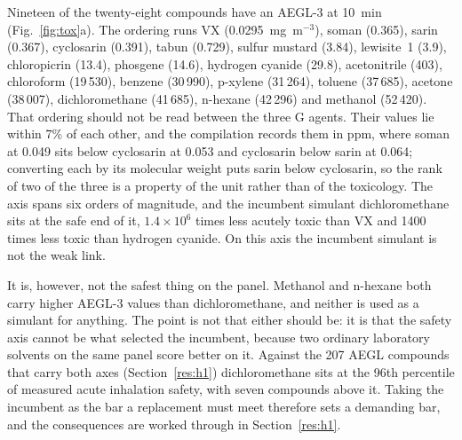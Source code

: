 \documentclass[journal=jacsat,manuscript=suppinfo,margin=1in]{achemso}
\begin{document}
Nineteen of the twenty-eight compounds have an AEGL-3 at 10~min
(Fig.~\ref{fig:tox}a). The ordering runs VX (0.0295~mg~m$^{-3}$), soman (0.365),
sarin (0.367), cyclosarin (0.391), tabun (0.729), sulfur mustard (3.84),
lewisite~1 (3.9), chloropicrin (13.4), phosgene (14.6), hydrogen cyanide (29.8),
acetonitrile (403), chloroform (19\,530), benzene (30\,990), p-xylene (31\,264),
toluene (37\,685), acetone (38\,007), dichloromethane (41\,685), n-hexane
(42\,296) and methanol (52\,420).
That ordering should not be read between
the three G agents. Their values lie within 7\% of each other, and the
compilation records them in ppm, where soman at 0.049 sits below cyclosarin at
0.053 and cyclosarin below sarin at 0.064; converting each by its molecular
weight puts sarin below cyclosarin, so the rank of two of the three is a
property of the unit rather than of the toxicology. The axis spans six orders of magnitude, and
the incumbent simulant dichloromethane sits at the safe end of it,
$1.4\times10^{6}$ times less acutely toxic than VX and 1400 times less toxic
than hydrogen cyanide. On this axis the incumbent simulant is not the weak link.

It is, however, not the safest thing on the panel. Methanol and n-hexane both
carry higher AEGL-3 values than dichloromethane, and neither is used as a
simulant for anything. The point is not that either should be: it is that the
safety axis cannot be what selected the incumbent, because two ordinary
laboratory solvents on the same panel score better on it. Against the 207 AEGL
compounds that carry both axes (Section~\ref{res:h1}) dichloromethane sits at
the 96th percentile of measured acute inhalation safety, with seven compounds
above it. Taking the incumbent as the bar a replacement must meet therefore sets
a demanding bar, and the consequences are worked through in
Section~\ref{res:h1}.
\end{document}
